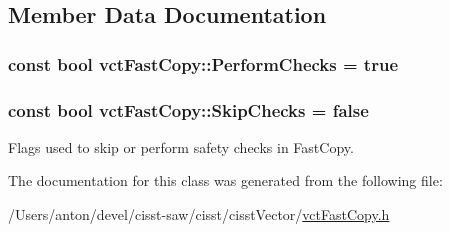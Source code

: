 \subsection{Member Data Documentation}
\hypertarget{classvct_fast_copy_af2981ae09904d1a4dd9b2d19c86c6cd9}{}
\subsubsection[{Perform\+Checks}]{\setlength{\rightskip}{0pt plus 5cm}const bool vct\+Fast\+Copy\+::\+Perform\+Checks = true\hspace{0.3cm}{\ttfamily [static]}}\label{classvct_fast_copy_af2981ae09904d1a4dd9b2d19c86c6cd9}
\hypertarget{classvct_fast_copy_a221c1b0117c8dcf51332ad84f4e0fda5}{}
\subsubsection[{Skip\+Checks}]{\setlength{\rightskip}{0pt plus 5cm}const bool vct\+Fast\+Copy\+::\+Skip\+Checks = false\hspace{0.3cm}{\ttfamily [static]}}\label{classvct_fast_copy_a221c1b0117c8dcf51332ad84f4e0fda5}
Flags used to skip or perform safety checks in Fast\+Copy. 

The documentation for this class was generated from the following file\+:\begin{DoxyCompactItemize}
\item 
/\+Users/anton/devel/cisst-\/saw/cisst/cisst\+Vector/\hyperlink{vct_fast_copy_8h}{vct\+Fast\+Copy.\+h}\end{DoxyCompactItemize}
